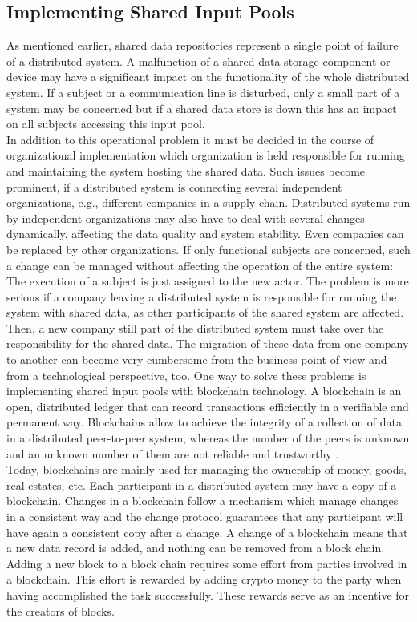 \subsection{Implementing Shared Input Pools}
As mentioned earlier, shared data repositories represent a single point of failure of a distributed system. A malfunction of a shared data storage component or device may have a significant impact on the functionality of the whole distributed system. If a subject or a communication line is disturbed, only a small part of a system may be concerned but if a shared data store is down this has an impact on all subjects accessing this input pool.
\\
In addition to this operational problem it must be decided in the course of organizational implementation which organization is held responsible for running and maintaining the system hosting the shared data. Such issues become prominent, if a distributed system is connecting several independent organizations, e.g., different companies in a supply chain. Distributed systems run by independent organizations may also have to deal with several changes dynamically, affecting the data quality and system stability. Even companies can be replaced by other organizations. If only functional subjects are concerned, such a change can be managed without affecting the operation of the entire system: The execution of a subject is just assigned to the new actor. The problem is more serious if a company leaving a distributed system is responsible for running the system with shared data, as other participants of the shared system are affected. Then, a new company still part of the distributed system must take over the responsibility for the shared data. The migration of these data from one company to another can become very cumbersome from the business point of view and from a technological perspective, too.
One way to solve these problems is implementing shared input pools with blockchain technology. A blockchain is an open, distributed ledger that can record transactions efficiently in a verifiable and permanent way. Blockchains allow to achieve the integrity of a collection of data in a distributed peer-to-peer system, whereas the number of the peers is unknown and an unknown number of them are not reliable and trustworthy \cite{book:Blockchainbasics}. 
\\
Today, blockchains are mainly used for managing the ownership of money, goods, real estates, etc. Each participant in a distributed system may have a copy of a blockchain. Changes in a blockchain follow a mechanism which manage changes in a consistent way and the change protocol guarantees that any participant will have again a consistent copy after a change. A change of a blockchain means that a new data record is added, and nothing can be removed from a block chain. Adding a new block to a block chain requires some effort from parties involved in a blockchain. This effort is rewarded by adding crypto money to the party when having accomplished the task successfully. These rewards serve as an incentive for the creators of blocks. 
